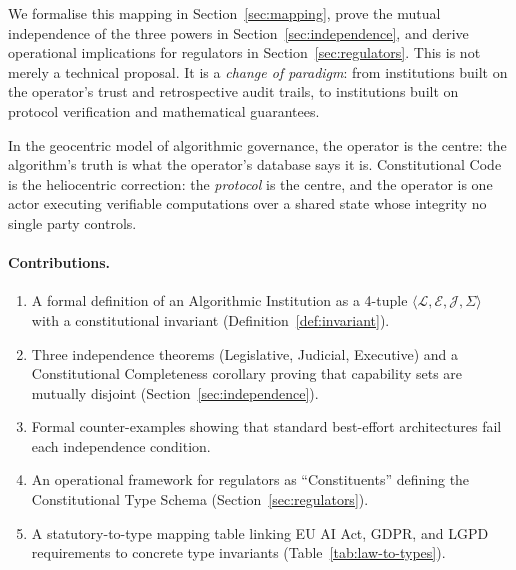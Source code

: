 We formalise this mapping in Section~\ref{sec:mapping}, prove the
mutual independence of the three powers in
Section~\ref{sec:independence}, and derive operational implications
for regulators in Section~\ref{sec:regulators}. This is not merely a
technical proposal. It is a \emph{change of paradigm}: from
institutions built on the operator's trust and retrospective audit
trails, to institutions built on protocol verification and
mathematical guarantees.

In the geocentric model of algorithmic governance, the operator is
the centre: the algorithm's truth is what the operator's database
says it is. Constitutional Code is the heliocentric correction:
the \emph{protocol} is the centre, and the operator is one actor
executing verifiable computations over a shared state whose integrity
no single party controls.

\paragraph{Contributions.}
\begin{enumerate}
  \item A formal definition of an Algorithmic Institution as a
  4-tuple $\langle \mathcal{L}, \mathcal{E}, \mathcal{J},
  \Sigma \rangle$ with a constitutional invariant
  (Definition~\ref{def:invariant}).
  \item Three independence theorems (Legislative, Judicial,
  Executive) and a Constitutional Completeness corollary proving
  that capability sets are mutually disjoint
  (Section~\ref{sec:independence}).
  \item Formal counter-examples showing that standard best-effort
  architectures fail each independence condition.
  \item An operational framework for regulators as
  ``Constituents'' defining the Constitutional Type Schema
  (Section~\ref{sec:regulators}).
  \item A statutory-to-type mapping table linking EU AI Act,
  GDPR, and LGPD requirements to concrete type invariants
  (Table~\ref{tab:law-to-types}).
\end{enumerate}
